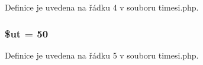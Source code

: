 Definice je uvedena na řádku 4 v souboru timesi.\-php.

\hypertarget{timesi_8php_aadd3f841051043ee58e587e840e8dd0b}{
\subsubsection[{\$ut}]{\setlength{\rightskip}{0pt plus 5cm}\$ut = 50}}\label{timesi_8php_aadd3f841051043ee58e587e840e8dd0b}


Definice je uvedena na řádku 5 v souboru timesi.\-php.

